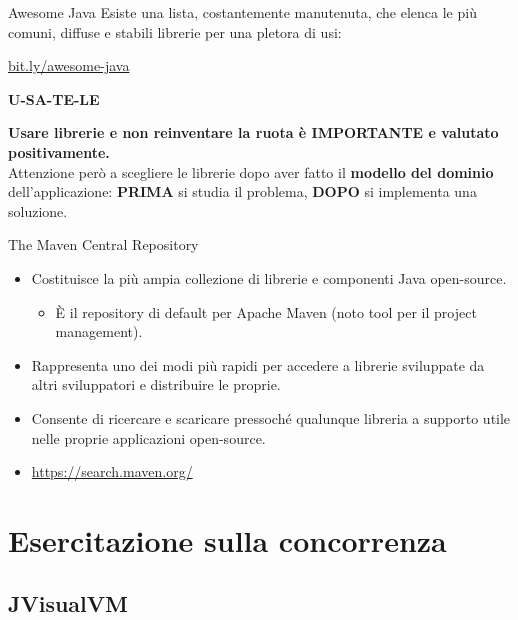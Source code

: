 \documentclass[presentation]{beamer}
\begin{document}
\begin{frame}{Awesome Java}
	Esiste una lista, costantemente manutenuta, che elenca le più comuni, diffuse e stabili librerie per una pletora di usi:
	\begin{center}
		\url{bit.ly/awesome-java}
	\end{center}
	\begin{center}
		\begin{LARGE}\textbf{U-SA-TE-LE}\end{LARGE}
	\end{center}
	\begin{center}
		\textbf{Usare librerie e non reinventare la ruota è \alert{IMPORTANTE} e valutato positivamente.}\\
		Attenzione però a scegliere le librerie dopo aver fatto il \textbf{modello del dominio} dell'applicazione: \textbf{PRIMA} si studia il problema, \textbf{DOPO} si implementa una soluzione.
	\end{center}
\end{frame}

\begin{frame}{The Maven Central Repository}
\begin{itemize}\itemsep10pt
\item Costituisce la più ampia collezione di librerie e componenti Java open-source.
\begin{itemize}
\item È il repository di default per Apache Maven (noto tool per il project management).
\end{itemize}
\item Rappresenta uno dei modi più rapidi per accedere a librerie sviluppate da altri sviluppatori e distribuire le proprie.
\item Consente di ricercare e scaricare pressoché qualunque libreria a supporto utile nelle proprie applicazioni open-source.

\item \url{https://search.maven.org/}
\end{itemize}
\end{frame}


\section{Esercitazione sulla concorrenza}

\subsection{JVisualVM}
\end{document}
